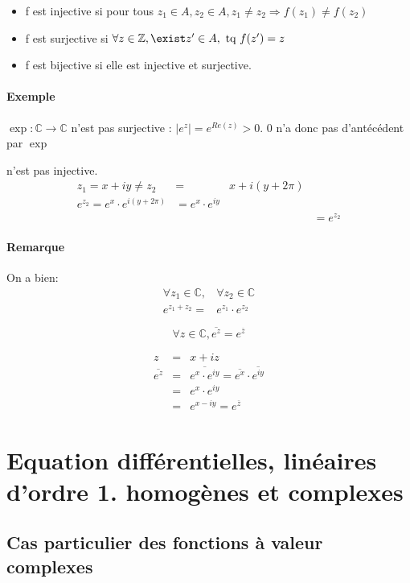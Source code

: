\begin{itemize}
	\item f est injective si pour tous $z_1 \in A, z_2 \in A, z_1 \neq z_2 \Rightarrow f(z_1) \neq f(z_2)$

	\item f est surjective si $\forall z \in \mathbb{Z}, \exist z' \in A, \text{ tq } f(z') = z$
	\item f est bijective si elle est injective et surjective.
\end{itemize}

\paragraph{Exemple} $\exp : \mathbb{C} \rightarrow \mathbb{C}$ n'est pas surjective : $|e^z| = e^{Re(z)} > 0$. 0 n'a donc pas d'antécédent par $\exp$

n'est pas injective.
\[\begin{array}{rclr}
z_1 = x + iy \neq z_2 &=& x+i(y+2\pi) \\
e^{z_2} = e^x \cdot e^{i(y+2\pi)} &= e^x \cdot e^{iy} \\
&&& = e^{z_2}\end{array}\]

\paragraph{Remarque}
On a bien:
\[\begin{array}{rl}
	\forall z_1 \in \mathbb{C},& \forall z_2 \in\mathbb{C} \\
e^{z_1 + z_2} =& e^{z_1}\cdot e^{z_2}
\end{array}\]

\[\forall z \in \mathbb{C}, \overline{e^z} = e^{\overline{z}}\]

\[\begin{array}{rcl}
	z &=& x+iz \\
\overline{e^{z}} &=& \overline{e^x \cdot e^{iy}} = \overline{e^x} \cdot \overline{e^{iy}} \\
&=& e^x \cdot e^{iy} \\
&=& e^{x-iy} = e^{\overline{z}}\end{array}\]

\section{Equation différentielles, linéaires d'ordre 1. homogènes et complexes}

\subsection{Cas particulier des fonctions à valeur complexes}

